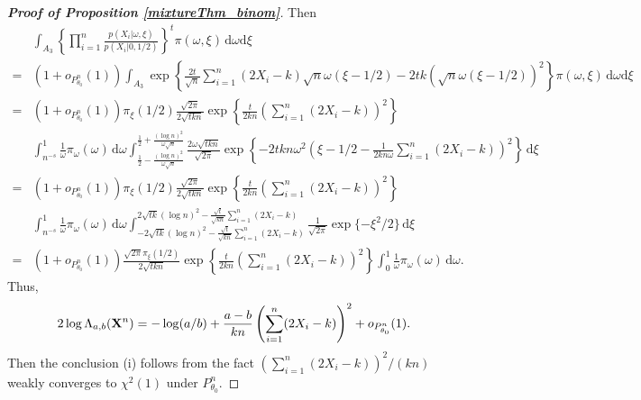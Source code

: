 \documentclass[11pt]{article}
\theoremstyle{plain}
\theoremstyle{definition}
\theoremstyle{remark}
\begin{document}
\begin{appendices}
\begin{proof}[\textbf{Proof of Proposition \ref{mixtureThm_binom}}]
Then
\begin{align*}
    &
\int_{A_3} \left\{\prod_{i=1}^n \frac{p(X_i|\omega, \xi)}{p(X_i|0, 1/2 )}\right\}^t \pi(\omega, \xi)\, \mathrm d\omega \mathrm d \xi
\\
=&
\left(1+o_{P_{\theta_0}^n}(1)\right)
\int_{A_3} 
\exp\left\{
    \frac{2t}{\sqrt n}  \sum_{i=1}^n \left(2 X_i - k \right)
     \sqrt n \omega ( \xi - 1/2 ) 
     - 2 t k \left( \sqrt n \omega ( \xi - 1/2 )\right)^2
\right\}
\pi(\omega, \xi)\, \mathrm d\omega \mathrm d \xi
\\
=&
\left(1+o_{P_{\theta_0}^n}(1)\right)
\pi_\xi(1/2)
\frac{\sqrt{2\pi}}
{
2 \sqrt{tkn}
}
\exp\left\{
\frac{t}{2kn} \left( \sum_{i=1}^n (2X_i - k)\right)^2
\right\}
\\
&
\int_{n^{-s}}^1
\frac{1}{\omega}
\pi_\omega (\omega)\, \mathrm d\omega
\int_{\frac 1 2 - \frac{(\log n)^2}{\omega \sqrt n}}^{\frac 1 2 + \frac{(\log n)^2}{\omega \sqrt n}}
\frac{2\omega \sqrt{tkn}}{\sqrt{2\pi}}
\exp\left\{
    -2tk n \omega^2 \left( \xi - 1/2 - \frac{1}{2k n \omega } \sum_{i=1}^n (2X_i - k) \right)^2
\right\}
\, \mathrm d \xi
\\
=&
\left(1+o_{P_{\theta_0}^n}(1)\right)
\pi_\xi(1/2)
\frac{\sqrt{2\pi}}
{
2 \sqrt{tkn}
}
\exp\left\{
\frac{t}{2kn} \left( \sum_{i=1}^n (2X_i - k)\right)^2
\right\}
\\
&
\int_{n^{-s}}^1
\frac{1}{\omega}
\pi_\omega (\omega)\, \mathrm d\omega
    \int_{-2\sqrt{tk} (\log n)^2 - \frac{\sqrt t}{\sqrt{kn}} \sum_{i=1}^n (2X_i - k)}^{2\sqrt{tk} (\log n)^2 - \frac{\sqrt t}{\sqrt{kn}} \sum_{i=1}^n (2X_i - k)} \frac{1}{\sqrt{2\pi}} \exp\{ - \xi^2/2\} \, \mathrm d \xi
\\
=&
\left(1+o_{P_{\theta_0}^n}(1)\right)
\frac{\sqrt{2\pi}\pi_\xi(1/2)}
{
2 \sqrt{tkn}
}
\exp\left\{
\frac{t}{2kn} \left( \sum_{i=1}^n (2X_i - k)\right)^2
\right\}
\int_{0}^1
\frac{1}{\omega}
\pi_\omega (\omega)\, \mathrm d\omega
.
\end{align*}
Thus,
\begin{align*}
    2\log \Lambda_{a,b} (\mathbf{X}^n)
    =
    -\log(a/b) + \frac{a-b}{kn} \left( \sum_{i=1}^n (2X_i - k)\right)^2 + o_{P_{\theta_0}^n}(1).
\end{align*}
Then the conclusion (i) follows from the fact $\left( \sum_{i=1}^n (2X_i - k)\right)^2/(kn)$ weakly converges to $\chi^2(1)$ under $P_{\theta_0}^n$.


\end{proof}
\end{appendices}
\end{document}
